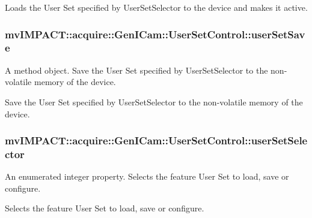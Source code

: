 Loads the User Set specified by User\+Set\+Selector to the device and makes it active. \hypertarget{classmv_i_m_p_a_c_t_1_1acquire_1_1_gen_i_cam_1_1_user_set_control_a6adfbcf1f208d5ea9940073587642dfe}{
\subsubsection[{user\+Set\+Save}]{ mv\+I\+M\+P\+A\+C\+T\+::acquire\+::\+Gen\+I\+Cam\+::\+User\+Set\+Control\+::user\+Set\+Save}}\label{classmv_i_m_p_a_c_t_1_1acquire_1_1_gen_i_cam_1_1_user_set_control_a6adfbcf1f208d5ea9940073587642dfe}


A method object. Save the User Set specified by User\+Set\+Selector to the non-\/volatile memory of the device. 

Save the User Set specified by User\+Set\+Selector to the non-\/volatile memory of the device. \hypertarget{classmv_i_m_p_a_c_t_1_1acquire_1_1_gen_i_cam_1_1_user_set_control_a60a24c73faea457a19659ef0e5e41e6c}{
\subsubsection[{user\+Set\+Selector}]{ mv\+I\+M\+P\+A\+C\+T\+::acquire\+::\+Gen\+I\+Cam\+::\+User\+Set\+Control\+::user\+Set\+Selector}}\label{classmv_i_m_p_a_c_t_1_1acquire_1_1_gen_i_cam_1_1_user_set_control_a60a24c73faea457a19659ef0e5e41e6c}


An enumerated integer property. Selects the feature User Set to load, save or configure. 

Selects the feature User Set to load, save or configure.

